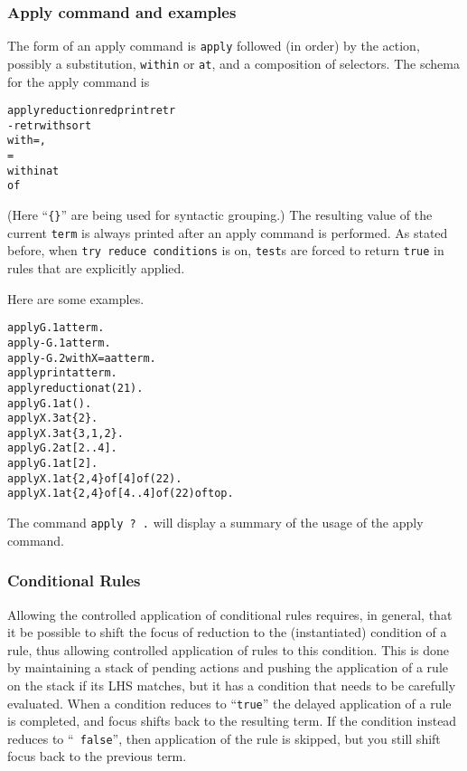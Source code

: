 \subsubsection{Apply command and examples}
The form of an apply command is {\tt apply} followed (in order) by the
action, possibly a substitution, {\tt within} or {\tt at}, and a
composition of selectors.  The schema for the apply command is
\begin{alltt}
        apply \lsg reduction \alt red \alt print \alt retr \alt
            -retr with sort  \alt
             \lopt with  = ,
                  = \rsg\itd\ropt \rsg
        \lsg within \alt at \rsg
         \lsg of  \rsg\itd
\end{alltt}
(Here ``{\tt \{\}}'' are being used for syntactic grouping.)  The
resulting value of the current {\tt term} is always printed after an
apply command is performed.  As stated before, when {\tt try reduce
  conditions} is on, {\tt test}s are forced to return {\tt true} in
rules that are explicitly applied.

Here are some examples.
\begin{alltt}
        apply G.1 at term .
        apply -G.1 at term .
        apply -G.2 with X = a at term .
        apply print at term .
        apply reduction at (2 1) .
        apply G.1 at () .
        apply X.3 at \{2\} .
        apply X.3 at \{3,1,2\} .
        apply G.2 at [2 .. 4] .
        apply G.1 at [2] .
        apply X.1 at \{2,4\} of [4] of (2 2) .
        apply X.1 at \{2,4\} of [4 .. 4] of (2 2) of top .
\end{alltt}

The command {\tt apply ? .} will display a summary of the usage
of the apply command.

\subsubsection{Conditional Rules}

Allowing the controlled application of conditional rules requires, in
general, that it be possible to shift the focus of reduction to the
(instantiated) condition of a rule, thus allowing controlled
application of rules to this condition.  This is done by maintaining a
stack of pending actions and pushing the application of a rule on the
stack if its LHS matches, but it has a condition that needs to be
carefully evaluated.  When a condition reduces to ``{\tt true}'' the
delayed application of a rule is completed, and focus shifts back to
the resulting term.  If the condition instead reduces to ``{\tt
  false}'', then application of the rule is skipped, but you still
shift focus back to the previous term.


